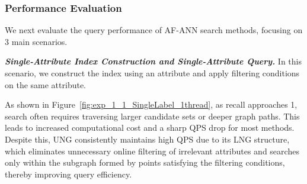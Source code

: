 \documentclass[sigconf, nonacm]{acmart}
\begin{document}
{%
%
%	
 
 
	\subsubsection{Performance Evaluation}
	
	
	
	
	We next evaluate the query performance of AF-ANN search methods, focusing on 3 main scenarios.
	
	\textit{\textbf{Single-Attribute Index Construction and Single-Attribute Query.}}
	In this scenario, we construct the index using an attribute and apply filtering conditions on the same attribute.
	
	
	
	As shown in Figure~\ref{fig:exp_1_1_SingleLabel_1thread}, as recall approaches 1, search often requires traversing larger candidate sets or deeper graph paths. This leads to increased computational cost and a sharp QPS drop for most methods. Despite this, UNG consistently maintains high QPS due to its LNG structure, which eliminates unnecessary online filtering of irrelevant attributes and searches only within the subgraph formed by points satisfying the filtering conditions, thereby improving query efficiency.
	
}
\end{document}
